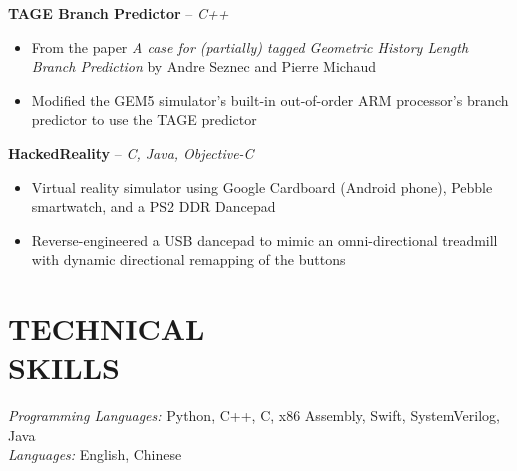 \documentclass[resmargin]{res}
\begin{document}
\begin{resume}
	\vspace{-3mm}
	{\bf TAGE Branch Predictor} -- {\sl C++} 
	\begin{itemize} \itemsep -1pt
	    \item From the paper {\sl A case for (partially) tagged Geometric History Length Branch Prediction} by Andre Seznec and Pierre Michaud
	    \item Modified the GEM5 simulator's built-in out-of-order ARM processor's branch predictor to use the TAGE predictor
	\end{itemize}
	
	\vspace{-3mm}
	{\bf HackedReality} -- {\sl C, Java, Objective-C}
	\begin{itemize} \itemsep -1pt
	    \item Virtual reality simulator using Google Cardboard (Android phone), Pebble smartwatch, and a PS2 DDR Dancepad
	    \item Reverse-engineered a USB dancepad to mimic an omni-directional treadmill with dynamic directional remapping of the buttons
	\end{itemize}

\vspace{-3mm}
\section{TECHNICAL \\ SKILLS} 
{\sl Programming Languages:} Python, C++, C, x86 Assembly, Swift, SystemVerilog, Java\\
{\sl Languages:} English, Chinese

\end{resume}
\end{document}
